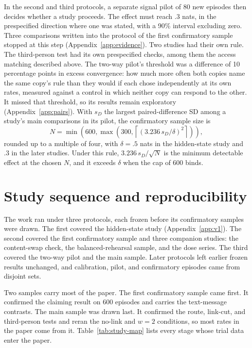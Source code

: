 In the second and third protocols, a separate signal pilot of 80 new
episodes then decides whether a study proceeds. The effect must reach
.3 nats, in the prespecified direction where one was stated, with a
90\% interval excluding zero. Three comparisons written into the
protocol of the first confirmatory sample stopped at this step
(Appendix~\ref{app:evidence}). Two studies had their own rule. The
third-person test had its own prespecified checks, among them the
access matching described above. The two-way pilot's threshold was a
difference of 10 percentage points in excess convergence: how much more
often both copies name the same copy's rule than they would if each
chose independently at its own rates, measured against a control in
which neither copy can respond to the other. It missed that threshold,
so its results remain exploratory (Appendix~\ref{app:pairs}). With $s_D$
the largest paired-difference SD among a study's main comparisons in its
pilot, the confirmatory sample size is
\begin{equation}
N=\min\!\left(600,\max\!\left(300,
\left\lceil(3.236\,s_D/\delta)^2\right\rceil\right)\right),
\end{equation}
rounded up to a multiple of four, with $\delta=.5$ nats in the
hidden-state study and $.3$ in the later studies. Under this rule,
$3.236\,s_D/\sqrt{N}$ is the minimum detectable effect at the chosen
$N$, and it exceeds $\delta$ when the cap of 600 binds.

\FloatBarrier
\section{Study sequence and reproducibility}
\label{app:timeline}

The work ran under three protocols, each frozen before its confirmatory
samples were drawn. The first covered the hidden-state study
(Appendix~\ref{app:v1}). The second covered the first confirmatory
sample and three companion studies: the content-swap check, the
balanced-rehearsal sample, and the dose series. The third covered the
two-way pilot and the main sample. Later protocols left earlier frozen
results unchanged, and calibration, pilot, and confirmatory episodes
came from disjoint sets.

Two samples carry most of the paper. The first confirmatory sample came
first. It confirmed the claiming result on 600 episodes and
carries the text-message contrasts. The main sample was drawn last. It
confirmed the route, link-cut, and third-person tests and reran the
no-link and $w=2$ conditions, so most rates in the paper come from it.
Table~\ref{tab:study-map} lists every stage whose trial data enter the
paper.

